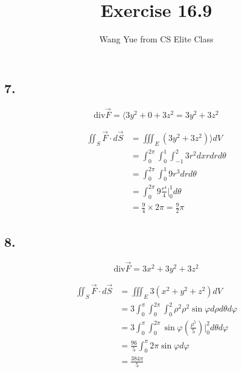 \documentclass{article}
\begin{document}
  \title{Exercise 16.9}
  \author{Wang Yue from CS Elite Class}
  \maketitle

  \subsection*{7.}
  
  $$\textrm{div} \overrightarrow F = \langle 3y^2+ 0+ 3z^2 = 3y^2 + 3z^2$$

  $$\begin{aligned}
    \iint_S \overrightarrow F \cdot d \overrightarrow S &= \iiint_E (3y^2 + 3z^2) \rangle dV \\
                                                        &= \int_0^{2\pi} \int_0^1 \int_{-1}^2 3r^2 dx r dr d\theta \\
                                                        &= \int_0^{2\pi} \int_0^1 9r^3 dr d\theta \\
                                                        &= \int_0^{2\pi} 9 \frac{r^4}{4}\biggl|_0^1 d\theta \\
                                                        &= \frac{9}{4} \times 2\pi = \frac{9}{2}\pi
  \end{aligned}
  $$

  \subsection*{8.}

  $$\textrm{div} \overrightarrow F = 3x^2 + 3y^2 + 3z^2$$

  $$\begin{aligned}
    \iint_S \overrightarrow F \cdot d \overrightarrow S &= \iiint_E 3(x^2 + y^2 + z^2) dV \\
                                                        &= 3 \int_0^{\pi} \int_0^{2\pi} \int_0^2 \rho^2 \rho^2 \sin \varphi d\rho  d\theta   d\varphi \\
                                                        &= 3 \int_0^{\pi} \int_0^{2\pi} \sin \varphi (\frac{\rho^5}{5})\biggl|_0^2 d\theta d\varphi \\
                                                        &= \frac{96}{5} \int_0^\pi 2\pi \sin \varphi d\varphi \\
                                                        &= \frac{384\pi}{5}
  \end{aligned}
  $$
\end{document}
